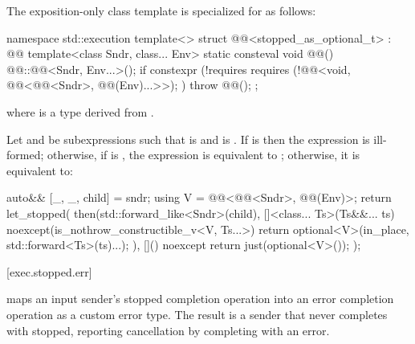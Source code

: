 \pnum
The exposition-only class template 
is specialized for  as follows:
\begin{codeblock}
namespace std::execution {
  template<>
  struct @@<stopped_as_optional_t> : @@ {
    template<class Sndr, class... Env>
      static consteval void @@() {
        @@::@@<Sndr, Env...>();
        if constexpr (!requires {
          requires (!@@<void, @@<@@<Sndr>,
                                                            @@(Env)...>>); })
          throw @@();
      }
  };
}
\end{codeblock}
where  is
a type derived from .

\pnum
Let  and  be subexpressions
such that  is  and
 is .
If 
is 
then the expression 
is ill-formed;
otherwise,
if 
is ,
the expression 
is equivalent to ;
otherwise, it is equivalent to:
\begin{codeblock}
auto&& [_, _, child] = sndr;
using V = @@<@@<Sndr>, @@(Env)>;
return let_stopped(
  then(std::forward_like<Sndr>(child),
       []<class... Ts>(Ts&&... ts) noexcept(is_nothrow_constructible_v<V, Ts...>) {
         return optional<V>(in_place, std::forward<Ts>(ts)...);
       }),
  []() noexcept { return just(optional<V>()); });
\end{codeblock}

[exec.stopped.err]{}

\pnum
{} maps an input sender's stopped completion operation
into an error completion operation as a custom error type.
The result is a sender that never completes with stopped,
reporting cancellation by completing with an error.

